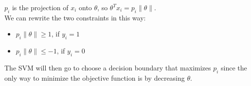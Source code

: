 $p_i$ is the projection of $x_i$ onto $\theta$, so $\theta^Tx_i = p_i\|\theta\|$. \\
We can rewrite the two constraints in this way:
\begin{itemize}
    \item $p_i\|\theta\| \geq 1$, if $y_i = 1$
    \item $p_i\|\theta\| \leq -1$, if $y_i = 0$
\end{itemize}
The SVM will then go to choose a decision boundary that maximizes $p_i$ since the only way to minimize the objective function is by decreasing $\theta$.

\newpage